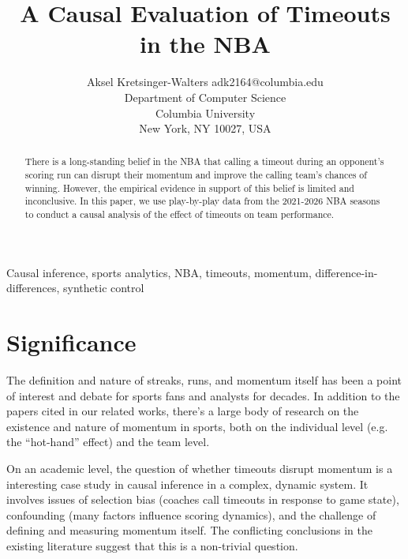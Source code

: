 \documentclass[twoside,11pt]{article}
\begin{document}
\title{A Causal Evaluation of Timeouts in the NBA}

\author{\name Aksel Kretsinger-Walters \email adk2164@columbia.edu \\
		\addr Department of Computer Science\\
		Columbia University\\
New York, NY 10027, USA}


\maketitle

\begin{abstract}%
		There is a long-standing belief in the NBA that calling a timeout during an opponent's scoring run can
		disrupt their momentum and improve the calling team's chances of winning. However, the empirical evidence
		in support of this belief is limited and inconclusive. In this paper, we use play-by-play data from the
		2021-2026 NBA seasons to conduct a causal analysis of the effect of timeouts on team performance.
\end{abstract}

\begin{keywords}
		Causal inference, sports analytics, NBA, timeouts, momentum, difference-in-differences, synthetic control
\end{keywords}

\section{Significance}

The definition and nature of streaks, runs, and momentum itself has been a point of interest and debate for
sports fans and analysts for decades. In addition to the papers cited in our related works, there's a large
body of research on the existence and nature of momentum in sports, both on the individual level (e.g. the
``hot-hand'' effect) and the team level.

On an academic level, the question of whether timeouts disrupt momentum is a interesting case study in causal
inference in a complex, dynamic system. It involves issues of selection bias (coaches call timeouts in
response to game state), confounding (many factors influence scoring dynamics), and the challenge of defining
and measuring momentum itself. The conflicting conclusions in the existing literature suggest that this is a
non-trivial question.
\end{document}

